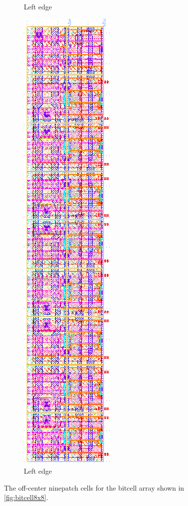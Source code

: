 \begin{figure}[H]
\begin{subfigure}[b]{0.22\textwidth}
\caption{Left edge}
\end{subfigure}
\hfill
\begin{subfigure}[b]{0.22\textwidth} \centering
\includegraphics[width=\textwidth]{figures/bitcell_left.png}
\caption{Left edge}
\end{subfigure}

\caption{The off-center ninepatch cells for the bitcell array shown in \ref{fig:bitcell8x8}. \label{fig:bitcell-ninepatch-tiles}}
\end{figure}

